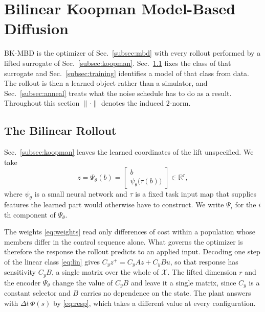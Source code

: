 \documentclass[letterpaper,10pt,conference]{ieeeconf}
\newcommand{\bkmbd}{\textsc{BK-MBD}}
\begin{document}
\section{Bilinear Koopman Model-Based Diffusion}\label{sec:method}

\bkmbd{} is the optimizer of Sec.~\ref{subsec:mbd} with every rollout performed by a lifted surrogate of Sec.~\ref{subsec:koopman}.
Sec.~\ref{subsec:bilinear} fixes the class of that surrogate and Sec.~\ref{subsec:training} identifies a model of that class from data.
The rollout is then a learned object rather than a simulator, and Sec.~\ref{subsec:anneal} treats what the noise schedule has to do as a result.
Throughout this section $\|\cdot\|$ denotes the induced $2$-norm.

\subsection{The Bilinear Rollout}\label{subsec:bilinear}

Sec.~\ref{subsec:koopman} leaves the learned coordinates of the lift unspecified.
We take
\begin{equation}
z = \Psi_\theta(b) = \begin{bmatrix} b \\ \psi_\theta\big(\tau(b)\big) \end{bmatrix} \in \mathbb{R}^{r},
\label{eq:lift}
\end{equation}
where $\psi_\theta$ is a small neural network and $\tau$ is a fixed task input map that supplies features the learned part would otherwise have to construct.
We write $\Psi_i$ for the $i$th component of $\Psi_\theta$.

The weights \eqref{eq:weights} read only differences of cost within a population whose members differ in the control sequence alone.
What governs the optimizer is therefore the response the rollout predicts to an applied input.
Decoding one step of the linear class \eqref{eq:lin} gives $C_y z^{+} = C_y A z + C_y B u$, so that response has sensitivity $C_y B$, a single matrix over the whole of $\mathcal{X}$.
The lifted dimension $r$ and the encoder $\Psi_\theta$ change the value of $C_y B$ and leave it a single matrix, since $C_y$ is a constant selector and $B$ carries no dependence on the state.
The plant answers with $\Delta t\, \Phi(s)$ by \eqref{eq:resp}, which takes a different value at every configuration.
\end{document}
